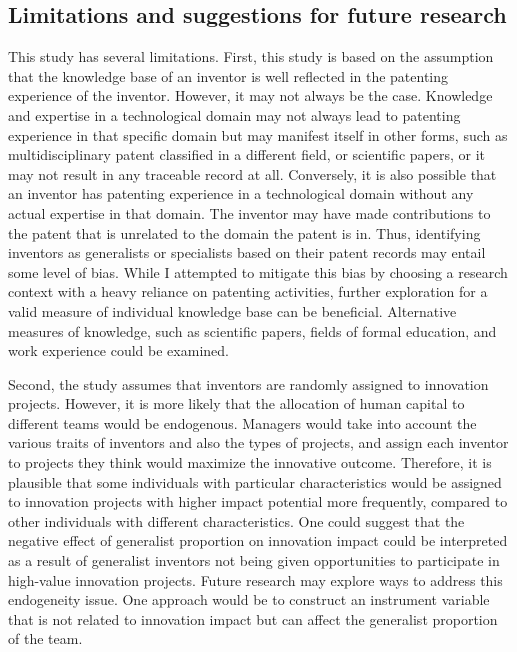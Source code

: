 \documentclass{article}
\begin{document}
\subsection{Limitations and suggestions for future research}
This study has several limitations. First, this study is based on the assumption that the knowledge base of an inventor is well reflected in the patenting experience of the inventor. However, it may not always be the case. Knowledge and expertise in a technological domain may not always lead to patenting experience in that specific domain but may manifest itself in other forms, such as multidisciplinary patent classified in a different field, or scientific papers, or it may not result in any traceable record at all. Conversely, it is also possible that an inventor has patenting experience in a technological domain without any actual expertise in that domain. The inventor may have made contributions to the patent that is unrelated to the domain the patent is in. Thus, identifying inventors as generalists or specialists based on their patent records may entail some level of bias. While I attempted to mitigate this bias by choosing a research context with a heavy reliance on patenting activities, further exploration for a valid measure of individual knowledge base can be beneficial. Alternative measures of knowledge, such as scientific papers, fields of formal education, and work experience could be examined.

Second, the study assumes that inventors are randomly assigned to innovation projects. However, it is more likely that the allocation of human capital to different teams would be endogenous. Managers would take into account the various traits of inventors and also the types of projects, and assign each inventor to projects they think would maximize the innovative outcome. Therefore, it is plausible that some individuals with particular characteristics would be assigned to innovation projects with higher impact potential more frequently, compared to other individuals with different characteristics. One could suggest that the negative effect of generalist proportion on innovation impact could be interpreted as a result of generalist inventors not being given opportunities to participate in high-value innovation projects. Future research may explore ways to address this endogeneity issue. One approach would be to construct an instrument variable that is not related to innovation impact but can affect the generalist proportion of the team.
\end{document}
